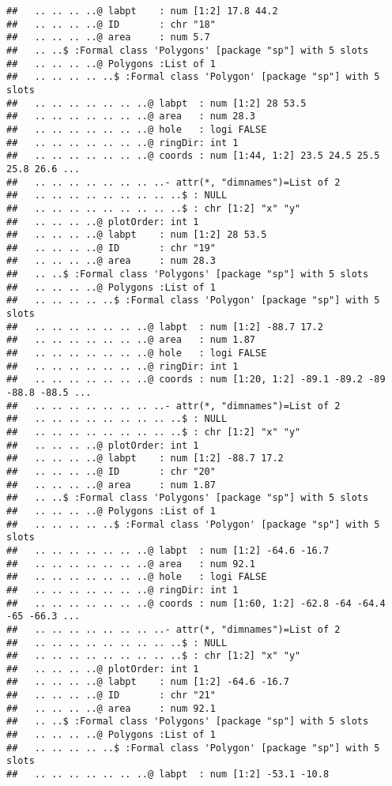 \documentclass[]{article}
\begin{document}
\begin{verbatim}
##   .. .. .. ..@ labpt    : num [1:2] 17.8 44.2
##   .. .. .. ..@ ID       : chr "18"
##   .. .. .. ..@ area     : num 5.7
##   .. ..$ :Formal class 'Polygons' [package "sp"] with 5 slots
##   .. .. .. ..@ Polygons :List of 1
##   .. .. .. .. ..$ :Formal class 'Polygon' [package "sp"] with 5 slots
##   .. .. .. .. .. .. ..@ labpt  : num [1:2] 28 53.5
##   .. .. .. .. .. .. ..@ area   : num 28.3
##   .. .. .. .. .. .. ..@ hole   : logi FALSE
##   .. .. .. .. .. .. ..@ ringDir: int 1
##   .. .. .. .. .. .. ..@ coords : num [1:44, 1:2] 23.5 24.5 25.5 25.8 26.6 ...
##   .. .. .. .. .. .. .. ..- attr(*, "dimnames")=List of 2
##   .. .. .. .. .. .. .. .. ..$ : NULL
##   .. .. .. .. .. .. .. .. ..$ : chr [1:2] "x" "y"
##   .. .. .. ..@ plotOrder: int 1
##   .. .. .. ..@ labpt    : num [1:2] 28 53.5
##   .. .. .. ..@ ID       : chr "19"
##   .. .. .. ..@ area     : num 28.3
##   .. ..$ :Formal class 'Polygons' [package "sp"] with 5 slots
##   .. .. .. ..@ Polygons :List of 1
##   .. .. .. .. ..$ :Formal class 'Polygon' [package "sp"] with 5 slots
##   .. .. .. .. .. .. ..@ labpt  : num [1:2] -88.7 17.2
##   .. .. .. .. .. .. ..@ area   : num 1.87
##   .. .. .. .. .. .. ..@ hole   : logi FALSE
##   .. .. .. .. .. .. ..@ ringDir: int 1
##   .. .. .. .. .. .. ..@ coords : num [1:20, 1:2] -89.1 -89.2 -89 -88.8 -88.5 ...
##   .. .. .. .. .. .. .. ..- attr(*, "dimnames")=List of 2
##   .. .. .. .. .. .. .. .. ..$ : NULL
##   .. .. .. .. .. .. .. .. ..$ : chr [1:2] "x" "y"
##   .. .. .. ..@ plotOrder: int 1
##   .. .. .. ..@ labpt    : num [1:2] -88.7 17.2
##   .. .. .. ..@ ID       : chr "20"
##   .. .. .. ..@ area     : num 1.87
##   .. ..$ :Formal class 'Polygons' [package "sp"] with 5 slots
##   .. .. .. ..@ Polygons :List of 1
##   .. .. .. .. ..$ :Formal class 'Polygon' [package "sp"] with 5 slots
##   .. .. .. .. .. .. ..@ labpt  : num [1:2] -64.6 -16.7
##   .. .. .. .. .. .. ..@ area   : num 92.1
##   .. .. .. .. .. .. ..@ hole   : logi FALSE
##   .. .. .. .. .. .. ..@ ringDir: int 1
##   .. .. .. .. .. .. ..@ coords : num [1:60, 1:2] -62.8 -64 -64.4 -65 -66.3 ...
##   .. .. .. .. .. .. .. ..- attr(*, "dimnames")=List of 2
##   .. .. .. .. .. .. .. .. ..$ : NULL
##   .. .. .. .. .. .. .. .. ..$ : chr [1:2] "x" "y"
##   .. .. .. ..@ plotOrder: int 1
##   .. .. .. ..@ labpt    : num [1:2] -64.6 -16.7
##   .. .. .. ..@ ID       : chr "21"
##   .. .. .. ..@ area     : num 92.1
##   .. ..$ :Formal class 'Polygons' [package "sp"] with 5 slots
##   .. .. .. ..@ Polygons :List of 1
##   .. .. .. .. ..$ :Formal class 'Polygon' [package "sp"] with 5 slots
##   .. .. .. .. .. .. ..@ labpt  : num [1:2] -53.1 -10.8

\end{verbatim}
\end{document}
